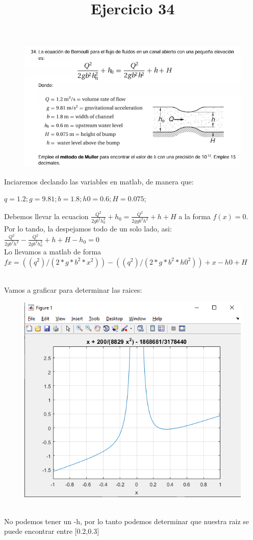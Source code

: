 \documentclass{article}
\title{Ejercicio 34}
\theoremstyle{mytheoremstyle}
\theoremstyle{mytheoremstyle}
\theoremstyle{myproblemstyle}
\begin{document}
\begin{figure}[ht]
    \includegraphics[scale=0.8]{img/mul34_1.png}
\end{figure}
 
Inciaremos declando las variables en matlab, de manera que:

$
q=1.2;
g=9.81;
b=1.8;
h0=0.6;
H=0.075;
$

Debemos llevar la ecuacion $\frac{Q^2}{2gb^2h_0^2}+h_0=\frac{Q^2}{2ggb^2h^2}+h+H$ a la forma $f(x)=0$. Por lo tando, la despejamos todo de un solo lado, asi:
\\$\frac{Q^2}{2gb^2h^2}-\frac{Q^2}{2gb^2h_0^2}+h+H-h_0=0$
\\Lo llevamos a matlab de forma $fx=((q^2)/(2*g*b^2*x^2))-((q^2)/(2*g*b^2*h0^2))+x-h0+H$


\noindent \\Vamos a graficar para determinar las raices:
\begin{figure}[ht]
    \includegraphics[scale=0.5]{img/mul34_2.png}
\end{figure}
\\No podemos tener un -h, por lo tanto podemos determinar que nuestra raiz se puede encontrar entre [0.2,0.3]
\end{document}
